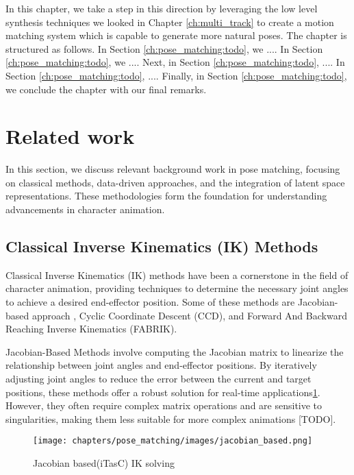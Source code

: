 \documentclass[../../main.tex]{subfiles}
\begin{document}
In this chapter, we take a step in this direction by leveraging the low level synthesis techniques we looked in Chapter \ref{ch:multi_track} to create a motion matching system which is capable to generate more natural poses.
The chapter is structured as follows. In Section \ref{ch:pose_matching:todo}, we .... In Section \ref{ch:pose_matching:todo}, we .... Next, in Section \ref{ch:pose_matching:todo}, .... In Section \ref{ch:pose_matching:todo}, .... Finally, in Section \ref{ch:pose_matching:todo}, we conclude the chapter with our final remarks.

\section{Related work}
\label{ch:pose_matching:related_work}

In this section, we discuss relevant background work in pose matching, focusing on classical methods, data-driven approaches, and the integration of latent space representations. These methodologies form the foundation for understanding advancements in character animation.

\subsection{Classical Inverse Kinematics (IK) Methods}
\label{ch:pose_matching:related_work:classical_ik}

Classical Inverse Kinematics (IK) methods have been a cornerstone in the field of character animation, providing techniques to determine the necessary joint angles to achieve a desired end-effector position. Some of these methods are Jacobian-based approach \cite{TODO itasc}, Cyclic Coordinate Descent (CCD)\cite{TODO}, and Forward And Backward Reaching Inverse Kinematics (FABRIK)\cite{TODO}.

Jacobian-Based Methods involve computing the Jacobian matrix to linearize the relationship between joint angles and end-effector positions. By iteratively adjusting joint angles to reduce the error between the current and target positions, these methods offer a robust solution for real-time applications\ref{fig:jacobian_based}. However, they often require complex matrix operations and are sensitive to singularities, making them less suitable for more complex animations [TODO].

\begin{figure}
    \centering \texttt{[image: chapters/pose\_matching/images/jacobian\_based.png]}
    \caption{Jacobian based(iTasC) IK solving}
    \label{fig:jacobian_based}
\end{figure}
\end{document}
